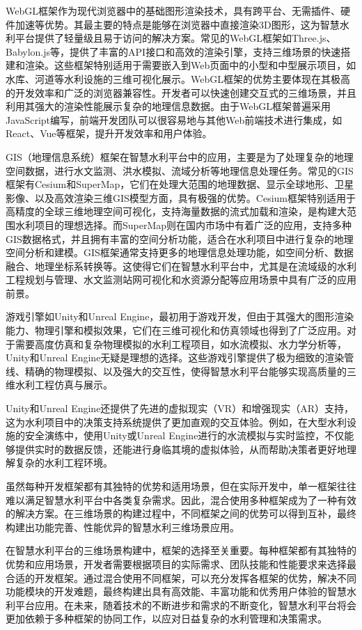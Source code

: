 WebGL框架作为现代浏览器中的基础图形渲染技术，具有跨平台、无需插件、硬件加速等优势。其最主要的特点是能够在浏览器中直接渲染3D图形，这为智慧水利平台提供了轻量级且易于访问的解决方案。常见的WebGL框架如Three.js、Babylon.js等，提供了丰富的API接口和高效的渲染引擎，支持三维场景的快速搭建和渲染。这些框架特别适用于需要嵌入到Web页面中的小型和中型展示项目，如水库、河道等水利设施的三维可视化展示。WebGL框架的优势主要体现在其极高的开发效率和广泛的浏览器兼容性。开发者可以快速创建交互式的三维场景，并且利用其强大的渲染性能展示复杂的地理信息数据。由于WebGL框架普遍采用JavaScript编写，前端开发团队可以很容易地与其他Web前端技术进行集成，如React、Vue等框架，提升开发效率和用户体验。

GIS（地理信息系统）框架在智慧水利平台中的应用，主要是为了处理复杂的地理空间数据，进行水文监测、洪水模拟、流域分析等地理信息处理任务。常见的GIS框架有Cesium和SuperMap，它们在处理大范围的地理数据、显示全球地形、卫星影像、以及高效渲染三维GIS模型方面，具有极强的优势。Cesium框架特别适用于高精度的全球三维地理空间可视化，支持海量数据的流式加载和渲染，是构建大范围水利项目的理想选择。而SuperMap则在国内市场中有着广泛的应用，支持多种GIS数据格式，并且拥有丰富的空间分析功能，适合在水利项目中进行复杂的地理空间分析和建模。GIS框架通常支持更多的地理信息处理功能，如空间分析、数据融合、地理坐标系转换等。这使得它们在智慧水利平台中，尤其是在流域级的水利工程规划与管理、水文监测站网可视化和水资源分配等应用场景中具有广泛的应用前景。

游戏引擎如Unity和Unreal Engine，最初用于游戏开发，但由于其强大的图形渲染能力、物理引擎和模拟效果，它们在三维可视化和仿真领域也得到了广泛应用。对于需要高度仿真和复杂物理模拟的水利工程项目，如水流模拟、水力学分析等，Unity和Unreal Engine无疑是理想的选择。这些游戏引擎提供了极为细致的渲染管线、精确的物理模拟、以及强大的交互性，使得智慧水利平台能够实现高质量的三维水利工程仿真与展示。

Unity和Unreal Engine还提供了先进的虚拟现实（VR）和增强现实（AR）支持，这为水利项目中的决策支持系统提供了更加直观的交互体验。例如，在大型水利设施的安全演练中，使用Unity或Unreal Engine进行的水流模拟与实时监控，不仅能够提供实时的数据反馈，还能进行身临其境的虚拟体验，从而帮助决策者更好地理解复杂的水利工程环境。

虽然每种开发框架都有其独特的优势和适用场景，但在实际开发中，单一框架往往难以满足智慧水利平台中各类复杂需求。因此，混合使用多种框架成为了一种有效的解决方案。在三维场景的构建过程中，不同框架之间的优势可以得到互补，最终构建出功能完善、性能优异的智慧水利三维场景应用。

在智慧水利平台的三维场景构建中，框架的选择至关重要。每种框架都有其独特的优势和应用场景，开发者需要根据项目的实际需求、团队技能和性能要求来选择最合适的开发框架。通过混合使用不同框架，可以充分发挥各框架的优势，解决不同功能模块的开发难题，最终构建出具有高效能、丰富功能和优秀用户体验的智慧水利平台应用。在未来，随着技术的不断进步和需求的不断变化，智慧水利平台将会更加依赖于多种框架的协同工作，以应对日益复杂的水利管理和决策需求。

